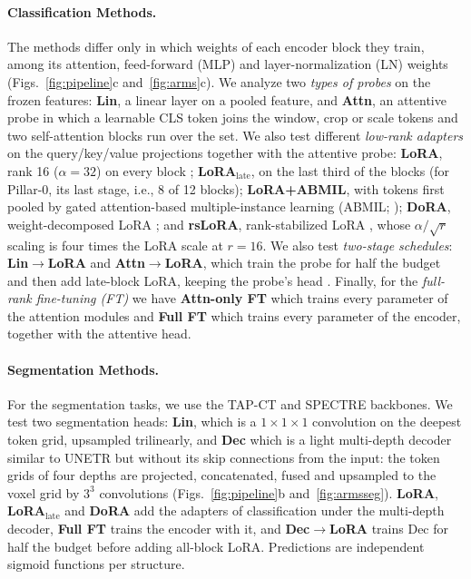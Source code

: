 \paragraph{Classification Methods.}\label{sec:ladder} The methods differ only in which weights of each encoder block they train, among its attention, feed-forward (MLP) and layer-normalization (LN) weights (Figs.~\ref{fig:pipeline}c and~\ref{fig:arms}c). We analyze two \textit{types of probes} on the frozen features: \textbf{Lin}, a linear layer on a pooled feature, and \textbf{Attn}, an attentive probe \citep{bardes2024vjepa,chen2024cae} in which a learnable CLS token joins the window, crop or scale tokens and two self-attention blocks run over the set. We also test different \emph{low-rank adapters} on the query/key/value projections together with the attentive probe: \textbf{LoRA}, rank 16 ($\alpha=32$) on every block \citep{hu2022lora}; \textbf{LoRA$_{\text{late}}$}, on the last third of the blocks (for Pillar-0, its last stage, i.e., 8 of 12 blocks); \textbf{LoRA+ABMIL}, with tokens first pooled by gated attention-based multiple-instance learning (ABMIL; \citealp{ilse2018abmil}); \textbf{DoRA}, weight-decomposed LoRA \citep{liu2024dora}; and \textbf{rsLoRA}, rank-stabilized LoRA \citep{kalajdzievski2023rslora}, whose $\alpha/\sqrt{r}$ scaling is four times the LoRA scale at $r=16$. We also test \emph{two-stage schedules}: \textbf{Lin$\to$LoRA} and \textbf{Attn$\to$LoRA}, which train the probe for half the budget and then add late-block LoRA, keeping the probe's head \citep{kumar2022lpft}. Finally, for the \emph{full-rank fine-tuning (FT)} we have \textbf{Attn-only FT} which trains every parameter of the attention modules \citep{touvron2022three} and \textbf{Full FT} which trains every parameter of the encoder, together with the attentive head.

\paragraph{Segmentation Methods.}\label{sec:segmethods} For the segmentation tasks, we use the TAP-CT and SPECTRE backbones. We test two segmentation heads: \textbf{Lin}, which is a $1\times1\times1$ convolution on the deepest token grid, upsampled trilinearly, and \textbf{Dec} which is a light multi-depth decoder similar to UNETR \citep{hatamizadeh2022unetr} but without its skip connections from the input: the token grids of four depths are projected, concatenated, fused and upsampled to the voxel grid by $3^3$ convolutions (Figs.~\ref{fig:pipeline}b and~\ref{fig:armsseg}). \textbf{LoRA}, \textbf{LoRA$_{\text{late}}$} and \textbf{DoRA} add the adapters of classification under the multi-depth decoder, \textbf{Full FT} trains the encoder with it, and \textbf{Dec$\to$LoRA} trains Dec for half the budget before adding all-block LoRA. Predictions are independent sigmoid functions per structure.

